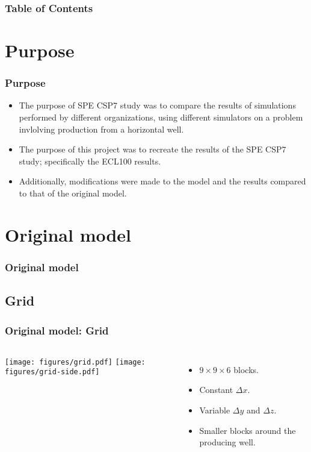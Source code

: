\documentclass{beamer}
\begin{document}
 
\frame{\titlepage}

\begin{frame}
    \frametitle{Table of Contents}
    \tableofcontents
\end{frame}
 
\section{Purpose}
\begin{frame}
    \frametitle{Purpose}
    \begin{itemize}
        \item The purpose of SPE CSP7 study was to compare the results of simulations performed by different organizations, using different simulators on a problem invlolving production from a horizontal well.
        \item The purpose of this project was to recreate the results of the SPE CSP7 study; specifically the ECL100 results.
        \item Additionally, modifications were made to the model and the results compared to that of the original model.
    \end{itemize}
\end{frame}

\section{Original model}
\begin{frame}
    \frametitle{Original model}
\end{frame}

\subsection{Grid}
\begin{frame}
    \frametitle{Original model: Grid}
    \begin{columns}[c]
            \texttt{[image: figures/grid.pdf]}
            \texttt{[image: figures/grid-side.pdf]}
            \begin{itemize}
                \item $9\times 9 \times 6$ blocks.
                \item Constant $\Delta x$.
                \item Variable $\Delta y$ and $\Delta z$. 
                \item Smaller blocks around the producing well.
            \end{itemize}
    \end{columns}
\end{frame}
\end{document}
